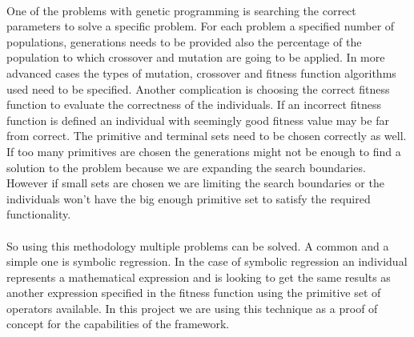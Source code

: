 \paragraph{}
One of the problems with genetic programming is searching the correct parameters to solve a specific problem. For each problem
a specified number of populations, generations needs to be provided also the percentage of the population to which crossover and
mutation are going to be applied. In more advanced cases the types of mutation, crossover and fitness function algorithms used need
to be specified. Another complication is choosing the correct fitness function to evaluate the correctness of the individuals. If 
an incorrect fitness function is defined an individual with seemingly good fitness value may be far from correct. The primitive
and terminal sets need to be chosen correctly as well. If too many primitives are chosen the generations might not be enough to 
find a solution to the problem because we are expanding the search boundaries. However if small sets are chosen we are 
limiting the search boundaries or the individuals won't have the big enough primitive set to satisfy the required functionality.
\paragraph{}
So using this methodology multiple problems can be solved. A common and a simple one is symbolic regression. In the case
of symbolic regression an individual represents a mathematical expression and is looking to get the same results as another expression
specified in the fitness function using the primitive set of operators available. In this project we are using this technique as a proof
of concept for the capabilities of the framework.